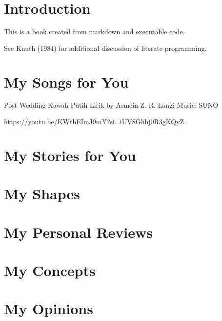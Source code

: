 \documentclass[
  letterpaper,
  DIV=11,
  numbers=noendperiod]{scrreprt}
\begin{document}

\chapter{Introduction}\label{introduction}

This is a book created from markdown and executable code.

See Knuth (1984) for additional discussion of literate programming.


\chapter{My Songs for You}\label{my-songs-for-you}

Post Wedding Kawah Putih Lirik by Armein Z. R. Langi Music: SUNO

\url{https://youtu.be/KWthEImJ9mY?si=iUV8Ghhj0R3gKQyZ}


\chapter{My Stories for You}\label{my-stories-for-you}


\chapter{My Shapes}\label{my-shapes}


\chapter{My Personal Reviews}\label{my-personal-reviews}


\chapter{My Concepts}\label{my-concepts}


\chapter{My Opinions}\label{my-opinions}
\end{document}
